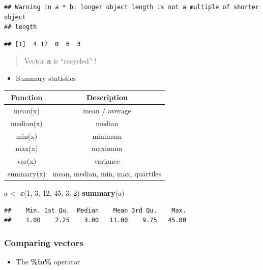 \documentclass[]{book}
\newenvironment{Shaded}{\begin{snugshade}}{\end{snugshade}}
\newcommand{\DecValTok}[1]{\textcolor[rgb]{0.00,0.00,0.81}{#1}}
\newcommand{\KeywordTok}[1]{\textcolor[rgb]{0.13,0.29,0.53}{\textbf{#1}}}
\newcommand{\NormalTok}[1]{#1}
\newcommand{\StringTok}[1]{\textcolor[rgb]{0.31,0.60,0.02}{#1}}
\providecommand{\tightlist}{%
  \setlength{\itemsep}{0pt}\setlength{\parskip}{0pt}}
\begin{document}
\begin{verbatim}
## Warning in a * b: longer object length is not a multiple of shorter object
## length
\end{verbatim}

\begin{verbatim}
## [1]  4 12  0  6  3
\end{verbatim}

\begin{quote}
Vector \textbf{a} is ``recycled'' !
\end{quote}

\begin{itemize}
\tightlist
\item
  Summary statistics
\end{itemize}

\begin{longtable}[]{@{}cc@{}}
\toprule
Function & Description\tabularnewline
\midrule
\endhead
mean(x) & mean / average\tabularnewline
median(x) & median\tabularnewline
min(x) & minimum\tabularnewline
max(x) & maximum\tabularnewline
var(x) & variance\tabularnewline
summary(x) & mean, median, min, max, quartiles\tabularnewline
\bottomrule
\end{longtable}

\begin{Shaded}
\begin{Highlighting}[]
\NormalTok{a <-}\StringTok{ }\KeywordTok{c}\NormalTok{(}\DecValTok{1}\NormalTok{, }\DecValTok{3}\NormalTok{, }\DecValTok{12}\NormalTok{, }\DecValTok{45}\NormalTok{, }\DecValTok{3}\NormalTok{, }\DecValTok{2}\NormalTok{)}
\KeywordTok{summary}\NormalTok{(a)}
\end{Highlighting}
\end{Shaded}

\begin{verbatim}
##    Min. 1st Qu.  Median    Mean 3rd Qu.    Max. 
##    1.00    2.25    3.00   11.00    9.75   45.00
\end{verbatim}

\hypertarget{comparing-vectors}{%
\subsubsection{Comparing vectors}\label{comparing-vectors}}

\begin{itemize}
\tightlist
\item
  The \textbf{\%in\%} operator
\end{itemize}
\end{document}
